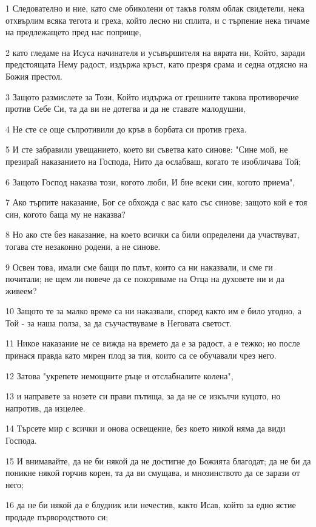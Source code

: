 \par 1 Следователно и ние, като сме обиколени от такъв голям облак свидетели, нека отхвърлим всяка тегота и греха, който лесно ни сплита, и с търпение нека тичаме на предлежащето пред нас поприще,
\par 2 като гледаме на Исуса начинателя и усъвършителя на вярата ни, Който, заради предстоящата Нему радост, издържа кръст, като презря срама и седна отдясно на Божия престол.
\par 3 Защото размислете за Този, Който издържа от грешните такова противоречие против Себе Си, та да ви не дотегва и да не ставате малодушни,
\par 4 Не сте се още съпротивили до кръв в борбата си против греха.
\par 5 И сте забравили увещанието, което ви съветва като синове: "Сине мой, не презирай наказанието на Господа, Нито да ослабваш, когато те изобличава Той;
\par 6 Защото Господ наказва този, когото люби, И бие всеки син, когото приема",
\par 7 Ако търпите наказание, Бог се обхожда с вас като със синове; защото кой е тоя син, когото баща му не наказва?
\par 8 Но ако сте без наказание, на което всички са били определени да участвуват, тогава сте незаконно родени, а не синове.
\par 9 Освен това, имали сме бащи по плът, които са ни наказвали, и сме ги почитали; не щем ли повече да се покоряваме на Отца на духовете ни и да живеем?
\par 10 Защото те за малко време са ни наказвали, според както им е било угодно, а Той - за наша полза, за да съучаствуваме в Неговата светост.
\par 11 Никое наказание не се вижда на времето да е за радост, а е тежко; но после принася правда като мирен плод за тия, които са се обучавали чрез него.
\par 12 Затова "укрепете немощните ръце и отслабналите колена",
\par 13 и направете за нозете си прави пътища, за да не се изкълчи куцото, но напротив, да изцелее.
\par 14 Търсете мир с всички и онова освещение, без което никой няма да види Господа.
\par 15 И внимавайте, да не би някой да не достигне до Божията благодат; да не би да поникне някой горчив корен, та да ви смущава, и мнозинството да се зарази от него;
\par 16 да не би някой да е блудник или нечестив, както Исав, който за едно ястие продаде първородството си;
